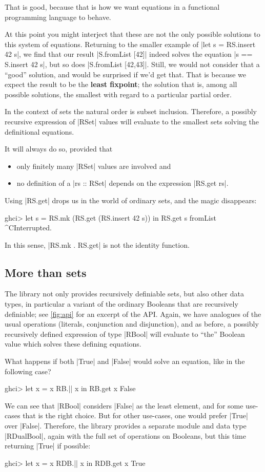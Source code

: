 \documentclass[manuscript,review,screen,acmsmall]{acmart}
\begin{document}
That is good, because that is how we want equations in a functional programming language to behave.

At this point you might interject that these are not the only possible solutions to this system of equations. Returning to the smaller example of |let s = RS.insert 42 s|, we find that our result |S.fromList [42]| indeed solves the equation |s == S.insert 42 s|, but so does |S.fromList [42,43]|. Still, we would not consider that a “good” solution, and would be surprised if we'd get that.
%
That is because we expect the result to be the \textbf{least fixpoint}; the solution that is, among all possible solutions, the smallest with regard to a particular partial order.

In the context of sets the natural order is subset inclusion. Therefore, a possibly recursive expression of |RSet| values will evaluate to the smallest sets solving the definitional equations.

It will always do so, provided that
\begin{itemize}
\item only finitely many |RSet| values are involved and
\item no definition of a |rs :: RSet| depends on the expression |RS.get rs|.
\end{itemize}
Using |RS.get| drops us in the world of ordinary sets, and the magic disappears:
\begin{code}
ghci> let s = RS.mk (RS.get (RS.insert 42 s)) in RS.get s
fromList ^CInterrupted.
\end{code}
In this sense, |RS.mk . RS.get| is not the identity function.

\subsection{More than sets}

The library not only provides recursively definiable sets, but also other data types, in particular a variant of the ordinary Booleans that are recursively definiable; see \cref{fig:api} for an excerpt of the API. Again, we have analogues of the usual operations (literals, conjunction and disjunction), and as before, a possibly recursively defined expression of type |RBool| will evaluate to “the” Boolean value which solves these defining equations.

What happens if both |True| and |False| would solve an equation, like in the following case?
\begin{code}
ghci> let x = x RB.|| x in RB.get x
False
\end{code}
We can see that |RBool| considers |False| as the least element, and for some use-cases that is the right choice. But for other use-cases, one would prefer |True| over |False|. Therefore, the library provides a separate module and data type |RDualBool|, again with the full set of operations on Booleans, but this time returning |True| if possible:
\begin{code}
ghci> let x = x RDB.|| x in RDB.get x
True
\end{code}
\end{document}
